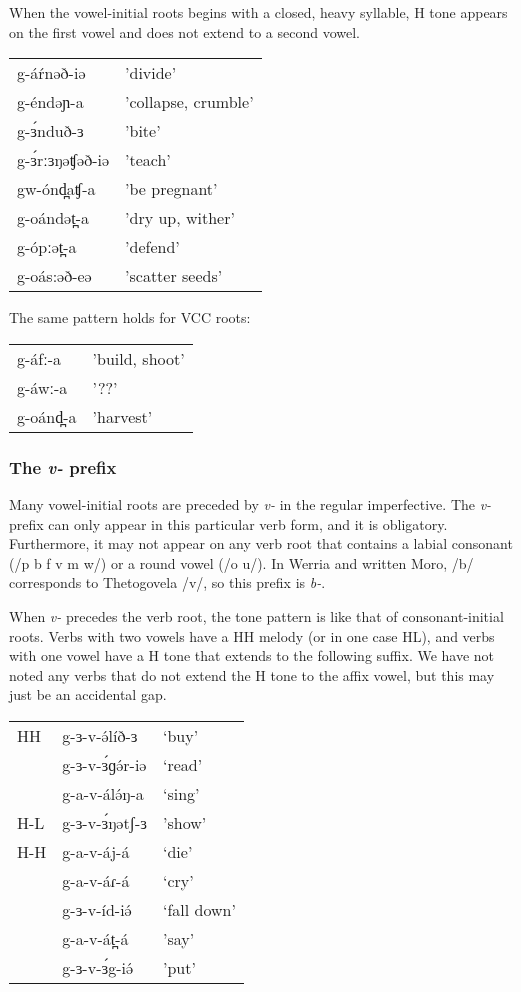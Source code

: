When the vowel-initial roots begins with a closed, heavy syllable, H tone appears on the first vowel and does not extend to a second vowel. 

\ea 
\begin{tabular}[t]{ll}
g-áŕnəð-iə	&	'divide'\\
g-éndəɲ-a	&	'collapse, crumble'\\
g-ɜ́nduð-ɜ	&	'bite'\\
g-ɜ́rːɜŋəʧəð-iə&	'teach'\\
gw-ónd̪aʧ-a	&	'be pregnant'\\
g-oándət̪-a	&	'dry up, wither'\\
g-ópːət̪-a	&	'defend'\\
g-oás:əð-eə	&	'scatter seeds'\\	
\end{tabular}
\z 

The same pattern holds for VCC roots:

\ea 
\begin{tabular}[t]{ll}
g-áfː-a	&	'build, shoot'\\
g-áwː-a	&	'??'\\ %
g-oánd̪-a&	'harvest'\\	
\end{tabular}
\z 


\subsubsection{The \textit{v-} prefix}\label{sec:ch11:vprefix}

Many vowel-initial roots are preceded by \textit{v-} in the regular imperfective.  The \textit{v-} prefix can only appear in this particular verb form, and it is obligatory. Furthermore, it may not appear on any verb root that contains a labial consonant (/p b f v m w/) or a round vowel (/o u/). In Werria and written Moro, /b/ corresponds to Thetogovela /v/, so this prefix is \textit{b-}.

When \textit{v-} precedes the verb root, the tone pattern is like that of consonant-initial roots. Verbs with two vowels have a HH melody (or in one case HL), and verbs with one vowel have a H tone that extends to the following suffix. We have not noted any verbs that do not extend the H tone to the affix vowel, but this may just be an accidental gap. 

\ea 	
\begin{tabular}[t]{lll}
HH 	&  	g-ɜ-v-ə́líð-ɜ		&	‘buy’\\
	&	g-ɜ-v-ɜ́ɡə́r-iə	&	‘read’\\
	&	g-a-v-álə́ŋ-a		&	‘sing’\\
H-L &	g-ɜ-v-ɜ́ŋətʃ-ɜ	&	'show'\\
H-H &	g-a-v-áj-á		&	‘die’\\
	&	g-a-v-áɾ-á		&	‘cry’\\
	&	g-ɜ-v-íd-iə́		&	‘fall down’\\
	&	g-a-v-át̪-á		&	'say'\\
	&	g-ɜ-v-ɜ́g-iə́		&	'put'\\ 	
\end{tabular}
\z 

